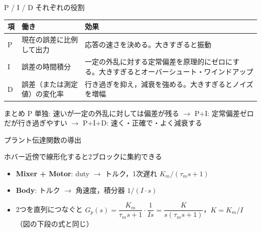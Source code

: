 \begin{frame}{P / I / D それぞれの役割\later}
  \begin{table}
    \centering\footnotesize
    \begin{tabular}{@{}l >{\raggedright\arraybackslash}p{40mm} >{\raggedright\arraybackslash}p{58mm}@{}}
      \hline
      \textbf{項} & \textbf{働き} & \textbf{効果} \\
      \hline
      P & 現在の誤差に比例して出力 & 応答の速さを決める。大きすぎると振動 \\
      I & 誤差の時間積分 & 一定の外乱に対する定常偏差を原理的にゼロにする。大きすぎるとオーバーシュート・ワインドアップ \\
      D & 誤差（または測定値）の変化率 & 行き過ぎを抑え，減衰を強める。大きすぎるとノイズを増幅 \\
      \hline
    \end{tabular}
  \end{table}

  \vspace{0.5em}

  \begin{exampleblock}{まとめ}\footnotesize
    P 単独: 速いが一定の外乱に対しては偏差が残る $\to$ P+I: 定常偏差ゼロだが行き過ぎやすい
    $\to$ P+I+D: 速く・正確で・よく減衰する
  \end{exampleblock}
\end{frame}


\begin{frame}{プラント伝達関数の導出}
  \begin{center}
    \vspace{-2mm}
  \end{center}

  \vspace{-0.3em}

  \begin{exampleblock}{ホバー近傍で線形化すると2ブロックに集約できる}\footnotesize
    \begin{itemize}\setlength{\itemsep}{0.2em}
      \item \textbf{Mixer + Motor}: duty $\to$ トルク，1次遅れ $K_m/(\tau_m s+1)$
      \item \textbf{Body}: トルク $\to$ 角速度，積分器 $1/(I \cdot s)$
      \item 2つを直列につなぐと $G_p(s)=\dfrac{K_m}{\tau_m s+1}\cdot\dfrac{1}{Is}
            =\dfrac{K}{s(\tau_m s+1)}$，$K=K_m/I$（図の下段の式と同じ）
    \end{itemize}
  \end{exampleblock}
\end{frame}

